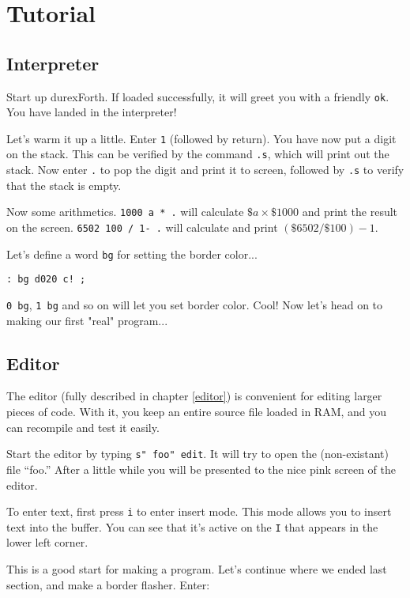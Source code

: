 \chapter{Tutorial}

\section{Interpreter}

Start up durexForth. If loaded successfully, it will greet you with a friendly \texttt{ok}. You have landed in the interpreter!

Let's warm it up a little. Enter \texttt{1} (followed by return). You have now put a digit on the stack. This can be verified by the command \texttt{.s}, which will print out the stack. Now enter \texttt{.} to pop the digit and print it to screen, followed by \texttt{.s} to verify that the stack is empty.

Now some arithmetics. \texttt{1000 a * .} will calculate $\$a \times \$1000$ and print the result on the screen. \texttt{6502 100 / 1- .} will calculate and print $(\$6502 / \$100) - 1$.

Let's define a word \texttt{bg} for setting the border color... 

\begin{verbatim}
: bg d020 c! ;
\end{verbatim}

\texttt{0 bg}, \texttt{1 bg} and so on will let you set border color. Cool! Now let's head on to making our first "real" program...

\section{Editor}

The editor (fully described in chapter \ref{editor}) is convenient for editing larger pieces of code. With it, you keep an entire source file loaded in RAM, and you can recompile and test it easily.

Start the editor by typing \texttt{s" foo" edit}. It will try to open the (non-existant) file ``foo.'' After a little while you will be presented to the nice pink screen of the editor.

To enter text, first press \texttt{i} to enter insert mode. This mode allows you to insert text into the buffer. You can see that it's active on the \texttt{I} that appears in the lower left corner.

This is a good start for making a program. Let's continue where we ended last section, and make a border flasher. Enter:

